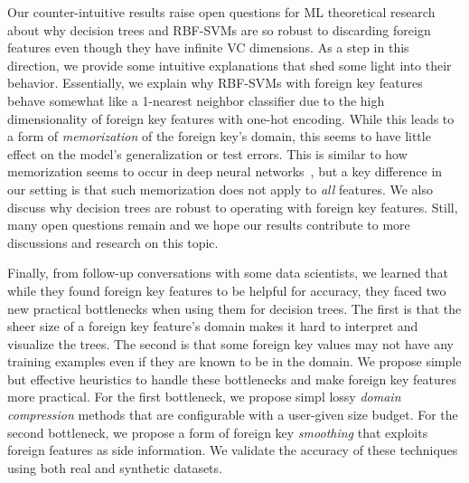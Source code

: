 \documentclass[sigconf]{acmart}
\newcommand{\eat}[1]{}
\begin{document}
Our counter-intuitive results raise open questions for ML theoretical research about why decision trees and RBF-SVMs are so robust to discarding 
foreign features even though they have infinite VC dimensions. As a step in this direction, we provide some intuitive explanations that shed some light into their behavior. 
Essentially, we explain why RBF-SVMs with foreign key features behave somewhat like a 1-nearest neighbor classifier due to the high dimensionality of foreign key features with 
one-hot encoding. While this leads to a form of \textit{memorization} of the foreign key's domain, this seems to have little effect on the model's generalization or test errors.
This is similar to how memorization seems to occur in deep neural networks~\cite{rechtdnn}, but a key difference in our setting is that such memorization does not apply to
\textit{all} features. We also discuss why decision trees are robust to operating with foreign key features. 
Still, many open questions remain and we hope our results contribute to more discussions and research on this topic.

\eat{
We extend the worst-case simulation scenario for linear models by replicating the foreign feature that determines the target multiple times. The idea is to make a model that uses 
the foreign key feature alone to overfit more than one that uses the foreign features. In particular, for the RBF-SVM, this scenario demonstrates that it behaves 
more similarly to a 1-nearest neighbor classifier when using the foreign key feature but less so when the number of relevant foreign features are increased.
}

Finally, from follow-up conversations with some data scientists, we learned that while they found foreign key features to be helpful for accuracy, they faced two new practical 
bottlenecks when using them for decision trees. The first is that the sheer size of a foreign key feature's domain makes it hard to interpret and visualize the trees. 
The second is that some foreign key values may not have any training examples even if they are known to be in the domain. 
We propose simple but effective heuristics to handle these bottlenecks and make foreign key features more practical. For the first bottleneck, we propose simpl lossy 
\textit{domain compression} methods that are configurable with a user-given size budget. For the second bottleneck, we propose a form of foreign key \textit{smoothing} 
that exploits foreign features as side information. We validate the accuracy of these techniques using both real and synthetic datasets.
\end{document}
